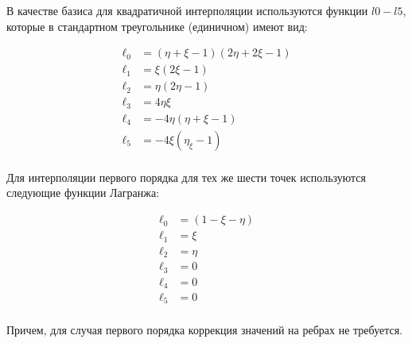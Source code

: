 В качестве базиса для квадратичной интерполяции используются функции $l0 - l5$, которые в стандартном треугольнике (единичном) имеют вид:

\begin {equation}
\begin {aligned}
\ell_0 &= (\eta + \xi -1)(2\eta + 2\xi - 1) \\
\ell_1 &= \xi(2\xi - 1) \\
\ell_2 &= \eta (2\eta - 1) \\
\ell_3 &= 4\eta\xi \\
\ell_4 &= -4\eta(\eta + \xi - 1) \\
\ell_5 &= -4\xi(\eta_\xi - 1) \\
\end {aligned}
\end {equation}

Для интерполяции первого порядка для тех же шести точек используются следующие функции Лагранжа:

\begin {equation}
\begin {aligned}
\ell_0 &= (1 - \xi - \eta) \\
\ell_1 &= \xi \\
\ell_2 &= \eta \\
\ell_3 &= 0 \\
\ell_4 &= 0 \\
\ell_5 &= 0 \\
\end {aligned}
\end {equation}

Причем, для случая первого порядка коррекция значений на ребрах не требуется.
